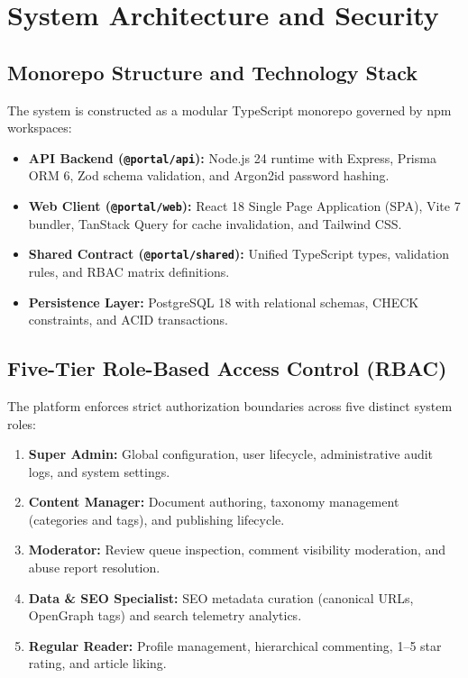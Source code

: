 \documentclass[conference]{IEEEtran}
\begin{document}
\section{System Architecture and Security}
\subsection{Monorepo Structure and Technology Stack}
The system is constructed as a modular TypeScript monorepo governed by npm workspaces:
\begin{itemize}
    \item \textbf{API Backend (\texttt{@portal/api}):} Node.js 24 runtime with Express, Prisma ORM 6, Zod schema validation, and Argon2id password hashing.
    \item \textbf{Web Client (\texttt{@portal/web}):} React 18 Single Page Application (SPA), Vite 7 bundler, TanStack Query for cache invalidation, and Tailwind CSS.
    \item \textbf{Shared Contract (\texttt{@portal/shared}):} Unified TypeScript types, validation rules, and RBAC matrix definitions.
    \item \textbf{Persistence Layer:} PostgreSQL 18 with relational schemas, CHECK constraints, and ACID transactions.
\end{itemize}

\subsection{Five-Tier Role-Based Access Control (RBAC)}
The platform enforces strict authorization boundaries across five distinct system roles:
\begin{enumerate}
    \item \textbf{Super Admin:} Global configuration, user lifecycle, administrative audit logs, and system settings.
    \item \textbf{Content Manager:} Document authoring, taxonomy management (categories and tags), and publishing lifecycle.
    \item \textbf{Moderator:} Review queue inspection, comment visibility moderation, and abuse report resolution.
    \item \textbf{Data \& SEO Specialist:} SEO metadata curation (canonical URLs, OpenGraph tags) and search telemetry analytics.
    \item \textbf{Regular Reader:} Profile management, hierarchical commenting, 1--5 star rating, and article liking.
\end{enumerate}
\end{document}
